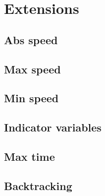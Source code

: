 \section{Extensions}
\label{section:extensions}

\subsection{Abs speed}

\subsection{Max speed}

\subsection{Min speed}

\subsection{Indicator variables}

\subsection{Max time}

\subsection{Backtracking}